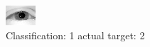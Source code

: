 \begin{figure}[h!]
\begin{center}
\includegraphics[width=0.60\columnwidth]{figures/ID2296_class_1_target_2.png}
\end{center}
\caption{ Classification: 1 actual target: 2}
\label{fig:ID2296_class_1_target_2}
\end{figure}

